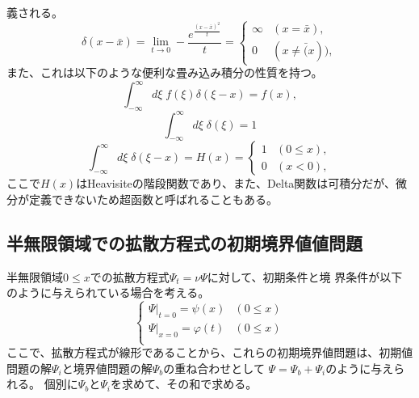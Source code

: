 義される。
\begin{equation}
 \delta(x-\bar{x})=
  \lim_{t\rightarrow 0}-\frac{e^{\frac{(x-\bar{x})^2}{t}}}{t}=
  \begin{cases}
   \infty & (x=\bar{x}), \\
   0 & (x\neq \bar(x)),
  \end{cases}
\end{equation}
また、これは以下のような便利な畳み込み積分の性質を持つ。
\begin{equation}
 \int_{-\infty}^{\infty}d\xi\mspace{5mu} f(\xi)\delta(\xi-x)=f(x),
\end{equation}
\begin{equation}
  \int_{-\infty}^{\infty}d\xi\mspace{5mu} \delta(\xi)=1
\end{equation}
\begin{equation}
  \int_{-\infty}^{\infty}d\xi\mspace{5mu} \delta(\xi-x)=H(x)=
   \begin{cases}
    1 & (0 \leq x), \\
    0 & (x < 0),
   \end{cases}
\end{equation}
ここで$H(x)$はHeavisiteの階段関数であり、また、Delta関数は可積分だが、微
分が定義できないため超函数と呼ばれることもある。

\subsection{半無限領域での拡散方程式の初期境界値値問題}
半無限領域$0\leq x$での拡散方程式$\Psi_t=\nu\Psi$に対して、初期条件と境
界条件が以下のように与えられている場合を考える。
\begin{equation}
 \begin{cases}
  \Psi|_{t=0} = \psi (x) & (0\leq x) \\
  \Psi|_{x=0} = \varphi (t) & (0\leq x) \\
 \end{cases}
\end{equation}
ここで、拡散方程式が線形であることから、これらの初期境界値問題は、初期値
問題の解$\Psi_i$と境界値問題の解$\Psi_b$の重ね合わせとして
$\Psi=\Psi_b+\Psi_i$のように与えられる。
個別に$\Psi_b$と$\Psi_i$を求めて、その和で求める。

